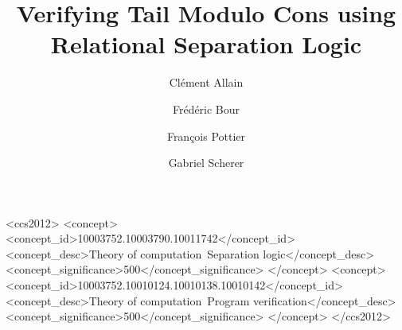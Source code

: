 \documentclass[acmsmall,screen,review,anonymous]{acmart}
\begin{document}

\title{Verifying Tail Modulo Cons using Relational Separation Logic}

\author{Clément Allain}

\author{Frédéric Bour}

\author{François Pottier}

\author{Gabriel Scherer}

\begin{abstract}
    
\end{abstract}

\maketitle


\begin{CCSXML}
<ccs2012>
<concept>
<concept_id>10003752.10003790.10011742</concept_id>
<concept_desc>Theory of computation~Separation logic</concept_desc>
<concept_significance>500</concept_significance>
</concept>
<concept>
<concept_id>10003752.10010124.10010138.10010142</concept_id>
<concept_desc>Theory of computation~Program verification</concept_desc>
<concept_significance>500</concept_significance>
</concept>
</ccs2012>
\end{CCSXML}




\clearpage


\clearpage


\clearpage


\clearpage


\clearpage


\clearpage


\clearpage


\clearpage


\clearpage


\end{document}
